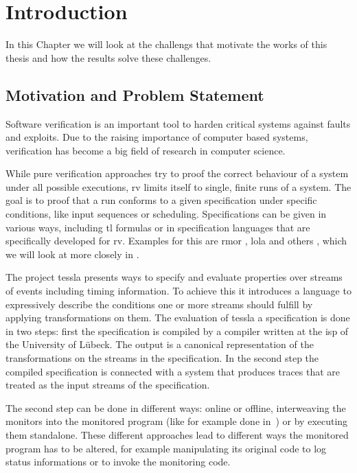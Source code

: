 %
\chapter{Introduction}
\label{sec:intro}

In this Chapter we will look at the challengs that motivate the works of this thesis and how the results solve these challenges.

\section{Motivation and Problem Statement}
\label{sec:intro:motivation}

Software verification is an important tool to harden critical systems against faults and exploits.
Due to the raising importance of computer based systems, verification has become a big field of research in computer science.

While pure verification approaches try to proof the correct behaviour of a system under all possible executions, \gls{rv} limits itself to single, finite runs of a system.
The goal is to proof that a run conforms to a given specification under specific conditions, like input sequences or scheduling.
Specifications can be given in various ways, including \gls{tl} formulas or in specification languages that are specifically developed for \gls{rv}.
Examples for this are \gls{rmor} \citep{Havelund2008}, \gls{lola} \citep{DAngelo2005} and others \citep{Zheng2015, Pike2010, Mostafa2015}, which we will look at more closely in .

The project \Gls{tessla}\citep{Decker2016} presents ways to specify and evaluate properties over streams of events including timing information.
To achieve this it introduces a language to expressively describe the conditions one or more streams should fulfill by applying transformations on them.
The evaluation of \gls{tessla} a specification is done in two steps: first the specification is compiled by a compiler written at the \gls{isp} of the University of Lübeck.
The output is a canonical representation of the transformations on the streams in the specification.
In the second step the compiled specification is connected with a system that produces traces that are treated as the input streams of the specification.

The second step can be done in different ways: online or offline, interweaving the monitors into the monitored program (like for example done in~\cite{Havelund2008}) or by executing them standalone.
These different approaches lead to different ways the monitored program has to be altered, for example manipulating its original code to log status informations or to invoke the monitoring code.

